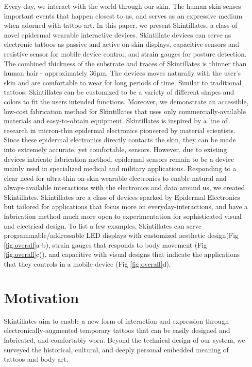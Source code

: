 \documentclass{sigchi}
\begin{document}
Every day, we interact with the world through our skin. The human skin senses important events that happen closest to us, and serves as an expressive medium when adorned with tattoo art. In this paper, we present Skintillates, a class of novel epidermal wearable interactive devices. Skintillate devices can serve as electronic tattoos as passive and active on-skin displays, capacitive sensors and resistive sensor for mobile device control, and strain gauges for posture detection. The combined thickness of the substrate and traces of Skintillates is thinner than human hair - approximately 36µm. The devices moves naturally with the user’s skin and are comfortable to wear for long periods of time. Similar to traditional tattoos, Skintillates can be customized to be a variety of different shapes and colors to fit the users intended functions. Moreover, we demonstrate an accessible, low-cost fabrication method for Skintillates that uses only commercially-available     materials     and      easy-to-obtain equipment. Skintillates is inspired by a line of research in micron-thin epidermal electronics pioneered by material scientists. Since these epidermal electronics directly contacts the skin, they can be made into extremely accurate, yet comfortable, sensors. However, due to existing devices intricate fabrication method, epidermal sensors remain to be a device mainly used in specialized medical and military applications. Responding to a clear need for ultra-thin on-skin wearable electronics to enable natural and always-available interactions with the electronics and data around us\cite{MunehikoSato:2012we,chris:2011ve,ChrisHarrison:2010vi,DavidKim:2012uu,Harrison:2014ft,Laput:2014du}, we created Skintillates. Skintillates are a class of devices sparked by Epidermal Electronics but tailored for applications that focus more on everyday-interactions, and have a fabrication method much more open to experimentation for sophisticated visual and electrical design. To list a few examples, Skintillates can serve programmable/addressable LED displays with customized aesthetic design(Fig \ref{fig:overall}a-b), strain gauges that responds to body movement (Fig \ref{fig:overall}c)), and capacitive with visual designs that indicate the applications that they controls in a mobile device (Fig \ref{fig:overall}d). 

\section{Motivation}
Skintillates aim to enable a new form of interaction and expression through electronically-augmented temporary tattoos that can be easily designed and fabricated, and comfortably worn. Beyond the technical design of our system, we surveyed the historical, cultural, and deeply personal embedded meaning of tattoos and body art.
\end{document}
